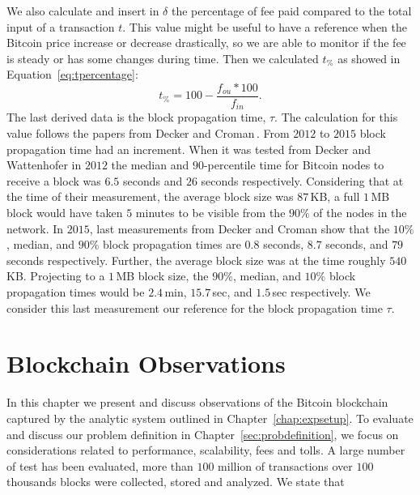 \documentclass[USenglish]{uit-thesis}
\begin{document}
We also calculate and insert in $\delta$ the percentage of fee paid
compared to the total input of a transaction $t$. This
value might be useful to have a reference when the
Bitcoin price increase or decrease drastically, so we are
able to monitor if the fee is steady or has some changes
during time. Then we calculated $t_\%$ as showed in
Equation~\ref{eq:tpercentage}:
\begin{equation}
\label{eq:tpercentage}
t_\% = 100 - \frac{f_{ou} *100}{f_{in}}.
\end{equation}
The last derived data is the block propagation time, $\tau$. The calculation
for this value follows the papers from Decker and
Croman\,\cite{Decker2013IPBN, croman2016}. From $2012$
to $2015$ block propagation time had an increment.
When it was tested from Decker and Wattenhofer in
$2012$ the median and $90$-percentile time for Bitcoin
nodes to receive a block was $6.5$ seconds and
$26$ seconds respectively. Considering that
at the time of their measurement, the average block size was $87$\,KB,
a full $1$\,MB block would have taken $5$ minutes to be
visible from the $90\%$ of the nodes in the network.
In $2015$, last measurements from Decker and Croman show
that the $10\%$, median, and $90\%$ block propagation times are
$0.8$ seconds, $8.7$ seconds, and $79$ seconds respectively.
Further, the average block size was at the time roughly $540$\,KB.
Projecting to a $1$\,MB block size, the $90\%$, median, and
$10\%$ block propagation times would be $2.4$\,min, $15.7$\,sec,
and $1.5$\,sec respectively. We consider this last measurement
our reference for the block propagation time $\tau$.

%

\chapter{Blockchain Observations}
\label{chap:evaluation}
In this chapter we present and discuss observations of the
Bitcoin blockchain captured by the
analytic system outlined in Chapter~\ref{chap:expsetup}. 
To evaluate and discuss our problem definition in Chapter~\ref{sec:probdefinition},
we focus on considerations related to performance,
scalability, fees and tolls.
A large number of test has been evaluated, more than $100$ million
of transactions over $100$ thousands blocks were collected, stored
and analyzed. We state that %
\end{document}
